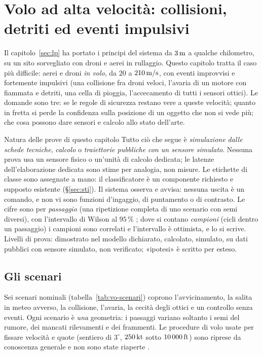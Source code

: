 \section{Volo ad alta velocità: collisioni, detriti ed eventi impulsivi}\label{sec:vo}
\sloppy

Il capitolo~\ref{sec:lp} ha portato i principi del sistema da $3\,\mathrm{m}$ a qualche chilometro, su un sito sorvegliato con droni e aerei in rullaggio. Questo capitolo tratta il caso più difficile: aerei e droni \emph{in volo}, da $20$ a $210\,\mathrm{m/s}$, con eventi improvvisi e fortemente impulsivi (una collisione fra droni veloci, l'avaria di un motore con fiammata e detriti, una cella di pioggia, l'accecamento di tutti i sensori ottici). Le domande sono tre: se le regole di sicurezza restano vere a queste velocità; quanto in fretta si perde la confidenza sulla posizione di un oggetto che non si vede più; che cosa possono dare sensori e calcolo allo stato dell'arte.

\begin{riquadro}{Natura delle prove di questo capitolo}
Tutto ciò che segue è \emph{simulazione dalle schede tecniche}, \emph{calcolo} o \emph{traiettorie pubbliche con un sensore simulato}. Nessuna prova usa un sensore fisico o un'unità di calcolo dedicata; le latenze dell'elaborazione dedicata sono stime per analogia, non misure. Le etichette di classe sono assegnate a mano: il classificatore è un componente richiesto e supposto esistente (\S\ref{sec:sti}). Il sistema osserva e avvisa: nessuna uscita è un comando, e non vi sono funzioni d'ingaggio, di puntamento o di contrasto. Le cifre sono per \emph{passaggio} (una ripetizione completa di uno scenario con semi diversi), con l'intervallo di Wilson al $95\,\%$ \cite{wilson1927}; dove si contano \emph{campioni} (cicli dentro un passaggio) i campioni sono correlati e l'intervallo è ottimista, e lo si scrive. Livelli di prova:  dimostrato nel modello dichiarato,  calcolato,  simulato,  su dati pubblici con sensore simulato,  non verificato; «ipotesi» è scritto per esteso.
\end{riquadro}

\subsection{Gli scenari}\label{sec:vo-scenari}

Sei scenari nominali (tabella~\ref{tab:vo-scenari}) coprono l'avvicinamento, la salita in meteo avverso, la collisione, l'avaria, la cecità degli ottici e un controllo senza eventi. Ogni scenario è \emph{una} geometria: i passaggi variano soltanto i semi del rumore, dei mancati rilevamenti e dei frammenti. Le procedure di volo usate per fissare velocità e quote (sentiero di $3^\circ$, $250\,\mathrm{kt}$ sotto $10\,000\,\mathrm{ft}$) sono riprese da conoscenza generale e non sono state riaperte .

